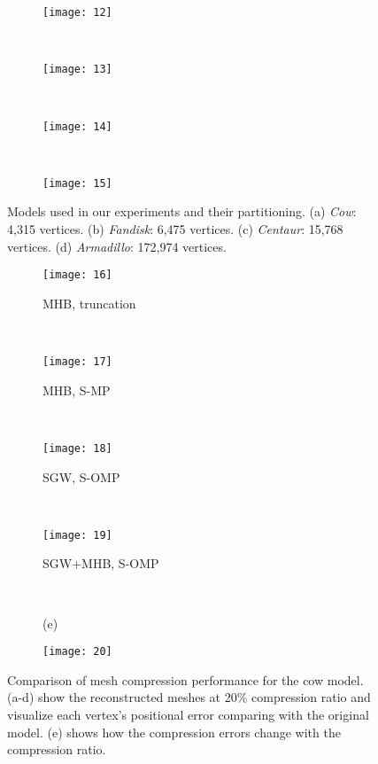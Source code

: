 \begin{figure}
    \centering
    \begin{subfigure}{0.4\linewidth}
        \texttt{[image: 12]}
        \caption{}
    \end{subfigure}
    ~
    \begin{subfigure}{0.4\linewidth}
        \texttt{[image: 13]}
        \caption{}
    \end{subfigure}
    ~
    \begin{subfigure}{0.4\linewidth}
        \texttt{[image: 14]}
        \caption{}
    \end{subfigure}
    ~
    \begin{subfigure}{0.4\linewidth}
        \texttt{[image: 15]}
        \caption{}
    \end{subfigure}
    \caption[Examples of Mesh partitioning.]
    {Models used in our experiments and their
     partitioning. (a) \emph{Cow}: 4,315 vertices. (b)
     \emph{Fandisk}: 6,475 vertices. (c) \emph{Centaur}: 15,768
     vertices. (d) \emph{Armadillo}: 172,974 vertices.}
    \label{fig:partitions}
\end{figure}

\begin{figure}
    \centering
    \begin{subfigure}{0.44\linewidth}
        \texttt{[image: 16]}
        \caption{MHB, truncation}
    \end{subfigure}
    ~
    \begin{subfigure}{0.44\linewidth}
        \texttt{[image: 17]}
        \caption{MHB, S-MP}
    \end{subfigure}
    \\
    \begin{subfigure}{0.44\linewidth}
        \texttt{[image: 18]}
        \caption{SGW, S-OMP}
    \end{subfigure}
    ~
    \begin{subfigure}{0.44\linewidth}
        \texttt{[image: 19]}
        \caption{SGW+MHB, S-OMP}
    \end{subfigure}
    \\
    \begin{subfigure}{0.05\linewidth}
        (e)
    \end{subfigure}
    \begin{subfigure}{0.83\linewidth}
        \texttt{[image: 20]}
    \end{subfigure}
    \caption[Mesh compression performance on the cow model.]
    {Comparison of mesh compression performance
        for the cow model. (a-d) show the reconstructed meshes at 20\%
        compression ratio and visualize each vertex's positional error
        comparing with the original model. (e) shows how the
        compression errors change with the compression ratio.}
    \label{fig:coweval}
\end{figure}

